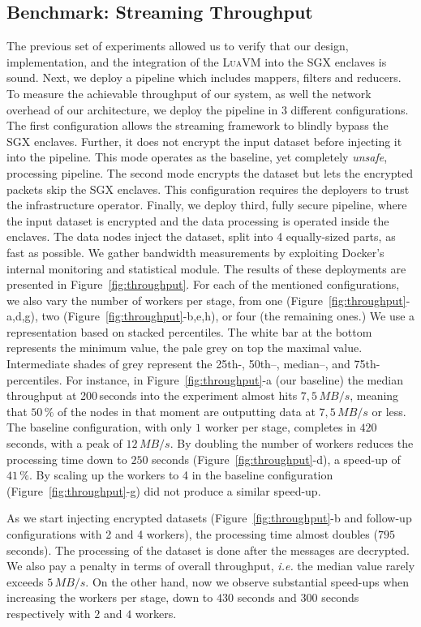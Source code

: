 \subsection{Benchmark: Streaming Throughput}
The previous set of experiments allowed us to verify that our design, implementation, and the integration of the \textsc{LuaVM} into the SGX enclaves is sound.
Next, we deploy a \SYS{} pipeline which includes mappers, filters and reducers.
To measure the achievable throughput of our system, as well the network overhead of our architecture,
we deploy the \SYS{} pipeline in 3 different configurations.
The first configuration allows the streaming framework to blindly bypass the SGX enclaves.
Further, it does not encrypt the input dataset before injecting it into the pipeline.
This mode operates as the baseline, yet completely \emph{unsafe}, processing pipeline.
The second mode encrypts the dataset but lets the encrypted packets skip the SGX enclaves.
This configuration requires the deployers to trust the infrastructure operator.
Finally, we deploy third, fully secure pipeline, where the input dataset is encrypted and the data processing is operated inside the enclaves.
The data nodes inject the dataset, split into 4 equally-sized parts, as fast as possible.
We gather bandwidth measurements by exploiting Docker's internal monitoring and statistical module.
The results of these deployments are presented in Figure~\ref{fig:throughput}.
For each of the mentioned configurations, we also vary the number of workers per stage, from one (Figure~\ref{fig:throughput}-a,d,g), two (Figure~\ref{fig:throughput}-b,e,h), or four (the remaining ones.)
We use a representation based on stacked percentiles.
The white bar at the bottom represents the minimum value, the pale grey on top the maximal value.
Intermediate shades of grey represent the 25th-, 50th–, median–, and 75th-percentiles.
For instance, in Figure~\ref{fig:throughput}-a (our baseline) the median throughput at 200\,seconds into the experiment almost hits $7,5\,MB/s$, meaning that $50\,\%$ of the nodes in that moment are outputting data at $7,5\,MB/s$ or less.
The baseline configuration, with only $1$ worker per stage, completes in $420$ seconds, with a peak of $12\,MB/s$.
By doubling the number of workers reduces the processing time down to $250$ seconds (Figure~\ref{fig:throughput}-d), a speed-up of $41\,\%$.
By scaling up the workers to 4 in the baseline configuration (Figure~\ref{fig:throughput}-g) did not produce a similar speed-up.

As we start injecting encrypted datasets (Figure~\ref{fig:throughput}-b and follow-up configurations with 2 and 4 workers), the processing time almost doubles ($795$ seconds).
The processing of the dataset is done after the messages are decrypted.
We also pay a penalty in terms of overall throughput, \emph{i.e.} the median value rarely exceeds $5\,MB/s$.
On the other hand, now we observe substantial speed-ups when increasing the workers per stage, down to $430$ seconds and $300$ seconds respectively with $2$ and $4$ workers.

